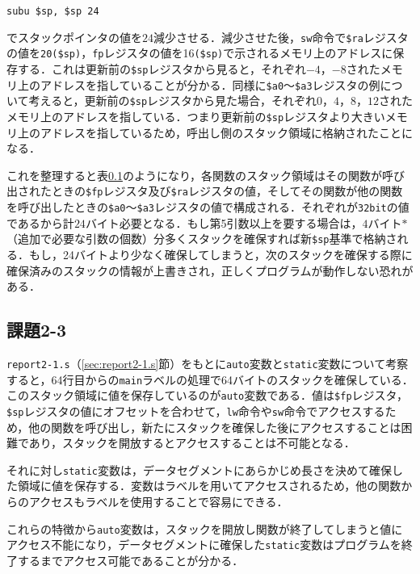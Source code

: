 \noindent \verb|subu $sp, $sp 24|

\noindent でスタックポインタの値を$24$減少させる．減少させた後，\verb|sw|命令で\verb|$ra|レジスタの値を\verb|20($sp)|，\verb|fp|レジスタの値を16\verb|($sp)|で示されるメモリ上のアドレスに保存する．これは更新前の\verb|$sp|レジスタから見ると，それぞれ$-4$，$-8$されたメモリ上のアドレスを指していることが分かる．同様に\verb|$a0|～\verb|$a3|レジスタの例について考えると，更新前の\verb|$sp|レジスタから見た場合，それぞれ$0$，$4$，$8$，$12$されたメモリ上のアドレスを指している．つまり更新前の\verb|$sp|レジスタより大きいメモリ上のアドレスを指しているため，呼出し側のスタック領域に格納されたことになる．

これを整理すると表\ref{}のようになり，各関数のスタック領域はその関数が呼び出されたときの\verb|$fp|レジスタ及び\verb|$ra|レジスタの値，そしてその関数が他の関数を呼び出したときの\verb|$a0|～\verb|$a3|レジスタの値で構成される．それぞれが\verb|32bit|の値であるから計$24$バイト必要となる．もし第5引数以上を要する場合は，$4$バイト$*$（追加で必要な引数の個数）分多くスタックを確保すれば新\verb|$sp|基準で格納される．もし，24バイトより少なく確保してしまうと，次のスタックを確保する際に確保済みのスタックの情報が上書きされ，正しくプログラムが動作しない恐れがある．


\subsection{課題2-3}
\verb|report2-1.s|（\ref{sec:report2-1.s}節）をもとに\verb|auto|変数と\verb|static|変数について考察すると，64行目からの\verb|main|ラベルの処理で64バイトのスタックを確保している．このスタック領域に値を保存しているのが\verb|auto|変数である．値は\verb|$fp|レジスタ，\verb|$sp|レジスタの値にオフセットを合わせて，\verb|lw|命令や\verb|sw|命令でアクセスするため，他の関数を呼び出し，新たにスタックを確保した後にアクセスすることは困難であり，スタックを開放するとアクセスすることは不可能となる．

それに対し\verb|static|変数は，データセグメントにあらかじめ長さを決めて確保した領域に値を保存する．変数はラベルを用いてアクセスされるため，他の関数からのアクセスもラベルを使用することで容易にできる．

これらの特徴から\verb|auto|変数は，スタックを開放し関数が終了してしまうと値にアクセス不能になり，データセグメントに確保した\verb|static|変数はプログラムを終了するまでアクセス可能であることが分かる．




